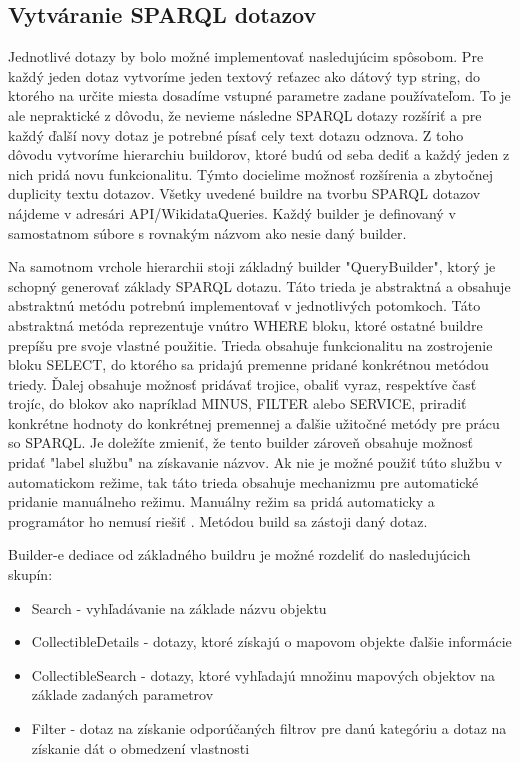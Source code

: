 \subsection{Vytváranie SPARQL dotazov}

Jednotlivé dotazy by bolo možné implementovať nasledujúcim spôsobom. Pre každý jeden dotaz vytvoríme jeden textový reťazec ako dátový typ string, do ktorého na určite miesta 
dosadíme vstupné parametre zadane používateľom. To je ale nepraktické z dôvodu, že nevieme následne SPARQL dotazy rozšíriť a pre každý ďalší novy dotaz je potrebné písať cely text dotazu odznova. 
Z toho dôvodu vytvoríme hierarchiu buildorov, ktoré budú od seba dediť a každý jeden z nich pridá novu funkcionalitu. Týmto docielime možnosť rozšírenia a zbytočnej duplicity textu dotazov. Všetky uvedené buildre na tvorbu SPARQL dotazov nájdeme v adresári API/WikidataQueries. Každý builder je definovaný v samostatnom súbore s rovnakým názvom ako nesie daný builder. 

Na samotnom vrchole hierarchii stoji základný builder "QueryBuilder", ktorý je schopný generovať základy SPARQL dotazu. Táto trieda je abstraktná a obsahuje abstraktnú metódu potrebnú implementovať v jednotlivých  
potomkoch. Táto abstraktná metóda reprezentuje vnútro WHERE bloku, ktoré ostatné buildre prepíšu pre svoje vlastné použitie. Trieda obsahuje funkcionalitu na zostrojenie bloku SELECT, do ktorého sa pridajú premenne pridané konkrétnou metódou triedy. Ďalej obsahuje možnosť pridávať trojice, 
obaliť vyraz, respektíve časť trojíc, do blokov ako napríklad MINUS, FILTER alebo  SERVICE, priradiť konkrétne hodnoty do konkrétnej premennej a ďalšie užitočné metódy pre prácu so SPARQL. 
Je doležíte zmieniť, že tento builder zároveň obsahuje možnosť pridať "label službu" na získavanie názvov. Ak nie je možné použiť túto službu v automatickom režime, tak táto trieda obsahuje mechanizmu 
pre automatické pridanie manuálneho režimu. Manuálny režim sa pridá automaticky a programátor ho nemusí riešiť . Metódou build sa zástoji daný dotaz. 

Builder-e dediace od základného buildru je možné rozdeliť do nasledujúcich skupín: 
\begin{itemize}
      \item Search - vyhľadávanie na základe názvu objektu
      \item CollectibleDetails - dotazy, ktoré získajú o mapovom objekte ďalšie informácie
      \item CollectibleSearch - dotazy, ktoré vyhľadajú množinu mapových objektov na základe zadaných parametrov
      \item Filter - dotaz na získanie odporúčaných filtrov pre danú kategóriu a dotaz na získanie dát o obmedzení vlastnosti
\end{itemize}

